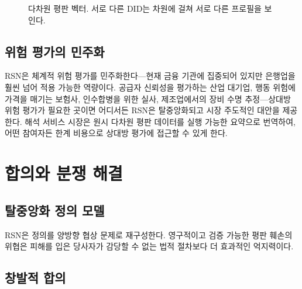 \documentclass[11pt,a4paper,twocolumn]{article}
\begin{document}
\begin{figure}[ht]
\centering
{}
\caption{다차원 평판 벡터. 서로 다른 DID는 차원에 걸쳐 서로 다른 프로필을 보인다.}
\label{fig:reputation-radar}
\end{figure}

\subsection{위험 평가의 민주화}

RSN은 체계적 위험 평가를 민주화한다---현재 금융 기관에 집중되어 있지만 은행업을 훨씬 넘어 적용 가능한 역량이다. 공급자 신뢰성을 평가하는 산업 대기업, 행동 위험에 가격을 매기는 보험사, 인수합병을 위한 실사, 제조업에서의 장비 수명 추정---상대방 위험 평가가 필요한 곳이면 어디서든 RSN은 탈중앙화되고 시장 주도적인 대안을 제공한다. 해석 서비스 시장은 원시 다차원 평판 데이터를 실행 가능한 요약으로 번역하여, 어떤 참여자든 한계 비용으로 상대방 평가에 접근할 수 있게 한다.

\section{합의와 분쟁 해결}

\subsection{탈중앙화 정의 모델}

RSN은 정의를 양방향 협상 문제로 재구성한다. 영구적이고 검증 가능한 평판 훼손의 위협은 피해를 입은 당사자가 감당할 수 없는 법적 절차보다 더 효과적인 억지력이다.

\subsection{창발적 합의}
\end{document}
